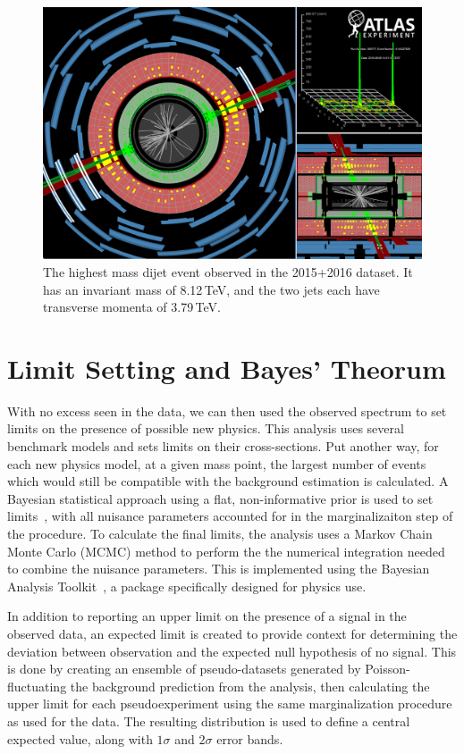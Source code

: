 \begin{figure}[ht!]
	\centering
	\includegraphics[width=\columnwidth]{figures/Results/LargestEvent.png}
	\caption{The highest mass dijet event observed in the 2015+2016 dataset.  It has an invariant mass of 8.12\,TeV, and the two jets each have transverse momenta of 3.79\,TeV.}
	\label{fig:LargestEvent}
\end{figure}

\section{Limit Setting and Bayes' Theorum}

With no excess seen in the data, we can then used the observed spectrum to set limits on the presence of possible new physics.  This analysis uses several benchmark models and sets limits on their cross-sections.  Put another way, for each new physics model, at a given mass point, the largest number of events which would still be compatible with the background estimation is calculated.  A Bayesian statistical approach using a flat, non-informative prior is used to set limits~\cite{Bayesian}, with all nuisance parameters accounted for in the marginalizaiton step of the procedure.  To calculate the final limits, the analysis uses a Markov Chain Monte Carlo (MCMC) method to perform the the numerical integration needed to combine the nuisance parameters.  This is implemented using the Bayesian Analysis Toolkit~\cite{BAT}, a package specifically designed for physics use.  

In addition to reporting an upper limit on the presence of a signal in the observed data, an expected limit is created to provide context for determining the deviation between observation and the expected null hypothesis of no signal.  This is done by creating an ensemble of pseudo-datasets generated by Poisson-fluctuating the background prediction from the analysis, then calculating the upper limit for each pseudoexperiment using the same marginalization procedure as used for the data.  The resulting distribution is used to define a central expected value, along with $1\sigma$ and $2\sigma$ error bands. 

